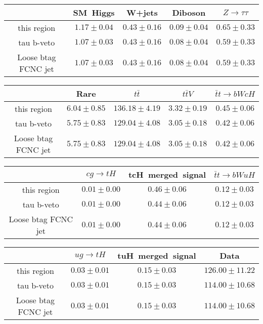 \centering
\begin{tabular}{|c|c|c|c|c|} \hline
 & SM~Higgs & W+jets & Diboson & $Z\to \tau\tau$\\\hline
this region & $1.17\pm0.04$ & $0.43\pm0.16$ & $0.09\pm0.04$ & $0.65\pm0.33$\\\hline
tau b-veto & $1.07\pm0.03$ & $0.43\pm0.16$ & $0.08\pm0.04$ & $0.59\pm0.33$\\\hline
Loose btag FCNC jet & $1.07\pm0.03$ & $0.43\pm0.16$ & $0.08\pm0.04$ & $0.59\pm0.33$\\\hline
\end{tabular}
\begin{tabular}{|c|c|c|c|c|} \hline
 & Rare & $t\bar{t}$ & $t\bar{t}V$ & $\bar{t}t\to bWcH$\\\hline
this region & $6.04\pm0.85$ & $136.18\pm4.19$ & $3.32\pm0.19$ & $0.45\pm0.06$\\\hline
tau b-veto & $5.75\pm0.83$ & $129.04\pm4.08$ & $3.05\pm0.18$ & $0.42\pm0.06$\\\hline
Loose btag FCNC jet & $5.75\pm0.83$ & $129.04\pm4.08$ & $3.05\pm0.18$ & $0.42\pm0.06$\\\hline
\end{tabular}
\begin{tabular}{|c|c|c|c|} \hline
 & $cg\to tH$ & tcH~merged~signal & $\bar{t}t\to bWuH$\\\hline
this region & $0.01\pm0.00$ & $0.46\pm0.06$ & $0.12\pm0.03$\\\hline
tau b-veto & $0.01\pm0.00$ & $0.44\pm0.06$ & $0.12\pm0.03$\\\hline
Loose btag FCNC jet & $0.01\pm0.00$ & $0.44\pm0.06$ & $0.12\pm0.03$\\\hline
\end{tabular}
\begin{tabular}{|c|c|c|c|} \hline
 & $ug\to tH$ & tuH~merged~signal & Data\\\hline
this region & $0.03\pm0.01$ & $0.15\pm0.03$ & $126.00\pm11.22$\\\hline
tau b-veto & $0.03\pm0.01$ & $0.15\pm0.03$ & $114.00\pm10.68$\\\hline
Loose btag FCNC jet & $0.03\pm0.01$ & $0.15\pm0.03$ & $114.00\pm10.68$\\\hline
\end{tabular}
